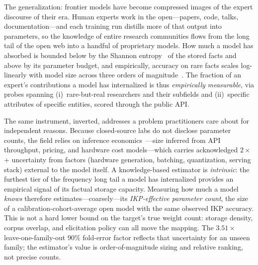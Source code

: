 \documentclass[11pt]{article}
\begin{document}
The generalization: frontier models have become compressed images of the expert discourse of their era. Human experts work in the open---papers, code, talks, documentation---and each training run distills more of that output into parameters, so the knowledge of entire research communities flows from the long tail of the open web into a handful of proprietary models. How much a model has absorbed is bounded below by the Shannon entropy~\citep{shannon1948mathematical} of the stored facts and above by its parameter budget, and empirically, accuracy on rare facts scales log-linearly with model size across three orders of magnitude~\citep{petroni2019language, roberts2020much, kandpal2023, lu2024factmemorization}. The fraction of an expert's contributions a model has internalized is thus \emph{empirically measurable}, via probes spanning (i)~rare-but-real researchers and their subfields and (ii)~specific attributes of specific entities, scored through the public API.

The same instrument, inverted, addresses a problem practitioners care about for independent reasons. Because closed-source labs do not disclose parameter counts, the field relies on inference economics~\citep{epochai2024, cai2025substitution}---size inferred from API throughput, pricing, and hardware cost models---which carries acknowledged $2\times$+ uncertainty from factors (hardware generation, batching, quantization, serving stack) external to the model itself. A knowledge-based estimator is \emph{intrinsic}: the furthest tier of the frequency long tail a model has internalized provides an empirical signal of its factual storage capacity. Measuring how much a model \emph{knows} therefore estimates---coarsely---its \emph{IKP-effective parameter count}, the size of a calibration-cohort-average open model with the same observed IKP accuracy. This is not a hard lower bound on the target's true weight count: storage density, corpus overlap, and elicitation policy can all move the mapping. The $3.51\times$ leave-one-family-out 90\% fold-error factor reflects that uncertainty for an unseen family; the estimator's value is order-of-magnitude sizing and relative ranking, not precise counts.
\end{document}
